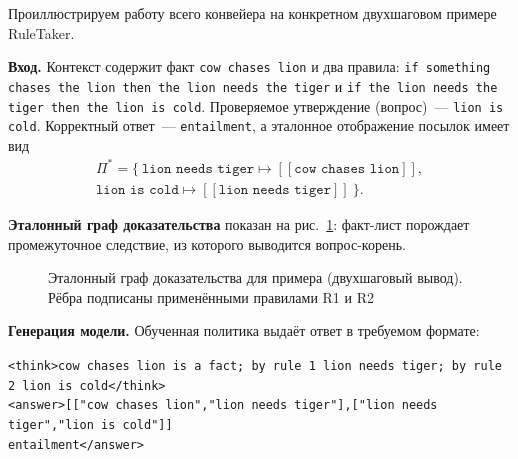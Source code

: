 Проиллюстрируем работу всего конвейера на конкретном двухшаговом примере RuleTaker.

\textbf{Вход.} Контекст содержит факт \texttt{cow chases lion} и два правила: \texttt{if something chases the lion then the lion needs the tiger} и \texttt{if the lion needs the tiger then the lion is cold}. Проверяемое утверждение (вопрос)~--- \texttt{lion is cold}. Корректный ответ~--- \texttt{entailment}, а эталонное отображение посылок имеет вид
\begin{multline*}
\Pi^* = \big\{\ \texttt{lion needs tiger} \mapsto [[\texttt{cow chases lion}]], \\
\texttt{lion is cold} \mapsto [[\texttt{lion needs tiger}]]\ \big\}.
\end{multline*}

\textbf{Эталонный граф доказательства} показан на рис.~\ref{fig:example-graph}: факт-лист порождает промежуточное следствие, из которого выводится вопрос-корень.

\begin{figure}[H]
\centering
{}
\caption{Эталонный граф доказательства для примера (двухшаговый вывод). Рёбра подписаны применёнными правилами R1 и R2}
\label{fig:example-graph}
\end{figure}

\textbf{Генерация модели.} Обученная политика выдаёт ответ в требуемом формате:
\begin{center}
\texttt{<think>cow chases lion is a fact; by rule 1 lion needs tiger; by rule 2 lion is cold</think>}\\
\texttt{<answer>[["cow chases lion","lion needs tiger"],["lion needs tiger","lion is cold"]]}\\
\texttt{entailment</answer>}
\end{center}

